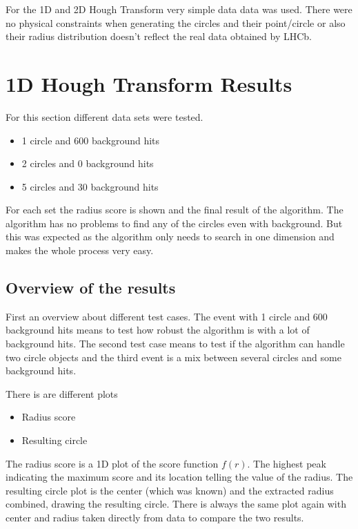 \documentclass[11pt,twoside]{scrreprt}
\begin{document}
For the 1D and 2D Hough Transform very simple data data was used. There were 
no physical constraints when generating the circles and their point/circle
or also their radius distribution doesn't reflect the real data obtained
by LHCb.

\section{1D Hough Transform Results} %
\label{sec:1d_hough_transform_results}
For this section different data sets were tested.
\begin{itemize}
  \item 1 circle and 600 background hits
  \item 2 circles and 0 background hits
  \item 5 circles and 30 background hits
\end{itemize}

For each set the radius score is shown and the final result of the algorithm.
The algorithm has no problems to find any of the circles even with background.
But this was expected as the algorithm only needs to search in one dimension
and makes the whole process very easy.

\subsection{Overview of the results} %
\label{sub:1d_overview_of_the_results}
First an overview about different test cases. The event with 1 circle and 600
background hits means to test how robust the algorithm is with a lot of
background hits. The second test case means to test if the algorithm can 
handle two circle objects and the third event is a mix between several
circles and some background hits.

There is are different plots
\begin{itemize}
  \item Radius score
  \item Resulting circle
\end{itemize}

The radius score is a 1D plot of the score function $f(r)$. The highest peak
indicating the maximum score and its location telling the value of the radius.
The resulting circle plot is the center (which was known) and the extracted radius combined, drawing the resulting circle. There is always the same plot
again with center and radius taken directly from data to compare the two results.
\end{document}
